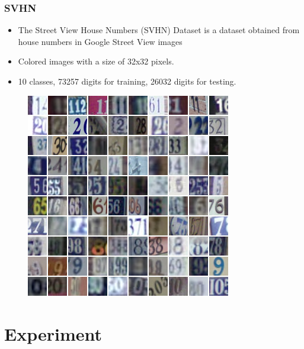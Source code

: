 \documentclass{beamer}
\begin{document}
\begin{frame}\frametitle{SVHN}
\begin{itemize}
	\item The Street View House Numbers (SVHN) Dataset is a dataset obtained from house numbers in Google Street View images
	\item Colored images with a size of 32x32 pixels.
	\item 10 classes, 73257 digits for training, 26032 digits for testing.
\end{itemize}
\begin{figure}[h]
	\includegraphics[scale=0.4]{figures/svhn}
	\centering
	\label{fig:svhn}
\end{figure}
\end{frame}

\section{Experiment} 
\end{document}
